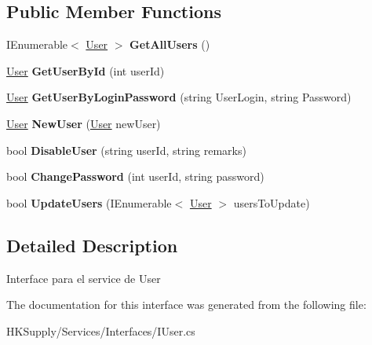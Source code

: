\subsection*{Public Member Functions}
\begin{DoxyCompactItemize}
\item 
\mbox{\label{interface_h_k_supply_1_1_services_1_1_interfaces_1_1_i_user_ab18e28f31a3a14a63df31f17991aeb43}} 
I\+Enumerable$<$ \hyperlink{class_h_k_supply_1_1_models_1_1_user}{User} $>$ {\bfseries Get\+All\+Users} ()
\item 
\mbox{\label{interface_h_k_supply_1_1_services_1_1_interfaces_1_1_i_user_a49a1d525d5ab93f26cbe66b1f22abe1a}} 
\hyperlink{class_h_k_supply_1_1_models_1_1_user}{User} {\bfseries Get\+User\+By\+Id} (int user\+Id)
\item 
\mbox{\label{interface_h_k_supply_1_1_services_1_1_interfaces_1_1_i_user_a814c835f9375a134f01ad961e27d7314}} 
\hyperlink{class_h_k_supply_1_1_models_1_1_user}{User} {\bfseries Get\+User\+By\+Login\+Password} (string User\+Login, string Password)
\item 
\mbox{\label{interface_h_k_supply_1_1_services_1_1_interfaces_1_1_i_user_a0f68a7ca2668977e45d199ea21522a98}} 
\hyperlink{class_h_k_supply_1_1_models_1_1_user}{User} {\bfseries New\+User} (\hyperlink{class_h_k_supply_1_1_models_1_1_user}{User} new\+User)
\item 
\mbox{\label{interface_h_k_supply_1_1_services_1_1_interfaces_1_1_i_user_af241b1a787265f454b2d5b33a8514ff0}} 
bool {\bfseries Disable\+User} (string user\+Id, string remarks)
\item 
\mbox{\label{interface_h_k_supply_1_1_services_1_1_interfaces_1_1_i_user_a437f1837393b7a306de3fecdce176c97}} 
bool {\bfseries Change\+Password} (int user\+Id, string password)
\item 
\mbox{\label{interface_h_k_supply_1_1_services_1_1_interfaces_1_1_i_user_a61282883d17b0cf41a07a93e9bd49db7}} 
bool {\bfseries Update\+Users} (I\+Enumerable$<$ \hyperlink{class_h_k_supply_1_1_models_1_1_user}{User} $>$ users\+To\+Update)
\end{DoxyCompactItemize}


\subsection{Detailed Description}
Interface para el service de User 



The documentation for this interface was generated from the following file\+:\begin{DoxyCompactItemize}
\item 
H\+K\+Supply/\+Services/\+Interfaces/I\+User.\+cs\end{DoxyCompactItemize}
